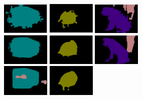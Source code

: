 \begin{figure}[h!]
\begin{subfigure}{0.4\textwidth}
		\includegraphics[width=0.25\textwidth]{image/chap04/result/compare/zoom_bus.png}
		\includegraphics[width=0.25\textwidth]{image/chap04/result/compare/zoom_bird.png}
		\includegraphics[width=0.25\textwidth]{image/chap04/result/compare/zoom_dog.png} \\
		\includegraphics[width=0.25\textwidth]{image/chap04/result/compare/deeplab_bus.png}
		\includegraphics[width=0.25\textwidth]{image/chap04/result/compare/deeplab_bird.png}
		\includegraphics[width=0.25\textwidth]{image/chap04/result/compare/deeplab_dog.png} \\
		\includegraphics[width=0.25\textwidth]{image/chap04/result/compare/my_bus.png}
		\includegraphics[width=0.25\textwidth]{image/chap04/result/compare/my_bird.png}

\end{subfigure}
\end{figure}
